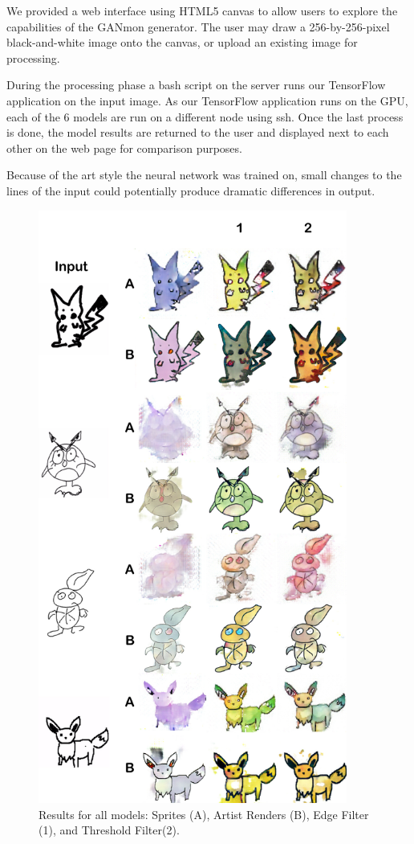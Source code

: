 \documentclass[sigchi]{acmart}
\begin{document}
We provided a web interface using HTML5 canvas to allow users to explore the capabilities of the GANmon generator. The user may draw a 256-by-256-pixel black-and-white image onto the canvas, or upload an existing image for processing.

During the processing phase a bash script on the server runs our TensorFlow application on the input image. As our TensorFlow application runs on the GPU, each of the 6 models are run on a different node using ssh. Once the last process is done, the model results are returned to the user and displayed next to each other on the web page for comparison purposes.

Because of the art style the neural network was trained on, small changes to the lines of the input could potentially produce dramatic differences in output.

\begin{figure}[h]
\includegraphics[width=4in]{figures/FinalResultsSmall.jpg}
\caption{Results for all models: Sprites (A), Artist Renders (B), Edge Filter (1), and Threshold Filter(2).}
\end{figure}
\end{document}
